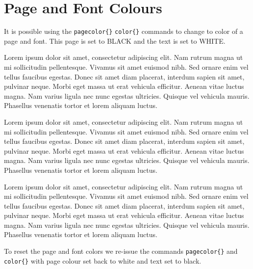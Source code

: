 \newpage

\pagecolor{black}
\color{white}

\section{Page and Font Colours}


It is possible using the \verb|pagecolor{}| \verb|color{}| commands to change to color of a page and font. This page is set to BLACK and the text is set to WHITE.

\vspace{0.4cm}

Lorem ipsum dolor sit amet, consectetur adipiscing elit. Nam rutrum magna ut mi sollicitudin pellentesque. Vivamus sit amet euismod nibh. Sed ornare enim vel tellus faucibus egestas. Donec sit amet diam placerat, interdum sapien sit amet, pulvinar neque. Morbi eget massa ut erat vehicula efficitur. Aenean vitae luctus magna. Nam varius ligula nec nunc egestas ultricies. Quisque vel vehicula mauris. Phasellus venenatis tortor et lorem aliquam luctus.


Lorem ipsum dolor sit amet, consectetur adipiscing elit. Nam rutrum magna ut mi sollicitudin pellentesque. Vivamus sit amet euismod nibh. Sed ornare enim vel tellus faucibus egestas. Donec sit amet diam placerat, interdum sapien sit amet, pulvinar neque. Morbi eget massa ut erat vehicula efficitur. Aenean vitae luctus magna. Nam varius ligula nec nunc egestas ultricies. Quisque vel vehicula mauris. Phasellus venenatis tortor et lorem aliquam luctus.


Lorem ipsum dolor sit amet, consectetur adipiscing elit. Nam rutrum magna ut mi sollicitudin pellentesque. Vivamus sit amet euismod nibh. Sed ornare enim vel tellus faucibus egestas. Donec sit amet diam placerat, interdum sapien sit amet, pulvinar neque. Morbi eget massa ut erat vehicula efficitur. Aenean vitae luctus magna. Nam varius ligula nec nunc egestas ultricies. Quisque vel vehicula mauris. Phasellus venenatis tortor et lorem aliquam luctus.

\newpage

\pagecolor{white}

\color{black}

To reset the page and font colors we re-issue the commands \verb|pagecolor{}| and  \verb|color{}| with page colour set back to white and text set to black. 

\vspace{0.4cm}

